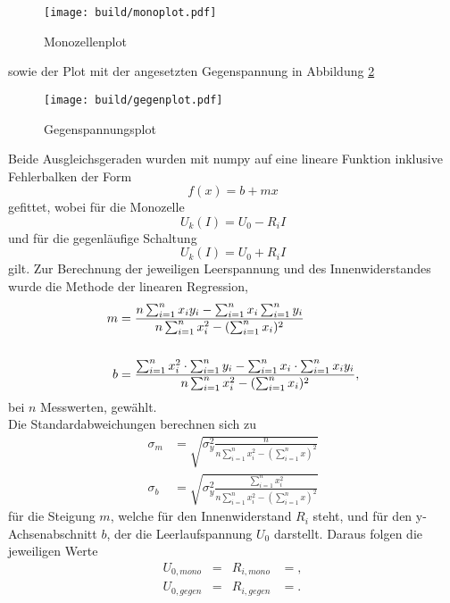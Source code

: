 \begin{figure}[H]
  \centering
  \texttt{[image: build/monoplot.pdf]}
  \caption{Monozellenplot}
  \label{fig:1}
\end{figure}

sowie der Plot mit der angesetzten Gegenspannung in Abbildung \ref{fig:2}

\begin{figure}[H]
  \centering
  \texttt{[image: build/gegenplot.pdf]}
  \caption{Gegenspannungsplot}
  \label{fig:2}
\end{figure}

Beide Ausgleichsgeraden wurden mit numpy auf eine lineare Funktion inklusive Fehlerbalken der Form
\begin{equation}
  f(x) = b + mx
\end{equation}
gefittet, wobei für die Monozelle
\begin{equation}
  U_k(I) = U_0 - R_iI
\end{equation}
und für die gegenläufige Schaltung
\begin{equation}
  U_k(I) = U_0 + R_iI
\end{equation}
gilt.
Zur Berechnung der jeweiligen Leerspannung und des Innenwiderstandes wurde die Methode der linearen Regression,
\begin{align}
  m &= \frac{ n \sum_{i=1}^n x_i y_i - \sum_{i=1}^n x_i \sum_{i=1}^n y_i }{n\sum_{i=1}^n x_i^2 - ( \sum_{i=1}^n x_i )^2}\\
  \notag\\
  b &= \frac{ \sum_{i=1}^n x_i^2 \cdot \sum_{i=1}^n y_i - \sum_{i=1}^n x_i \cdot \sum_{i=1}^n x_i y_i}{n\sum_{i=1}^n x_i^2 - ( \sum_{i=1}^n x_i )^2},
\end{align}
bei $n$ Messwerten, gewählt.
\\
Die Standardabweichungen berechnen sich zu
\begin{align}
  \sigma_m &= \sqrt{ \sigma_y^2 \frac{n}{n \sum_{i=1}^n x_i^2 - (\sum_{i=1}^n x)^2} }\\
  \sigma_b &= \sqrt{ \sigma_y^2 \frac{\sum_{i=1}^n x_i^2}{n \sum_{i=1}^n x_i^2 - (\sum_{i=1}^n x)^2} }
\end{align}
für die Steigung $m$, welche für den Innenwiderstand $R_i$ steht, und für den y-Achsenabschnitt $b$, der die Leerlaufspannung $U_0$ darstellt.%
Daraus folgen die jeweiligen Werte
\begin{align*}
  U_{0,{mono}}  &=   & R_{i,mono}  &= ,\\
  U_{0,{gegen}} &=  & R_{i,gegen} &= .
\end{align*}





